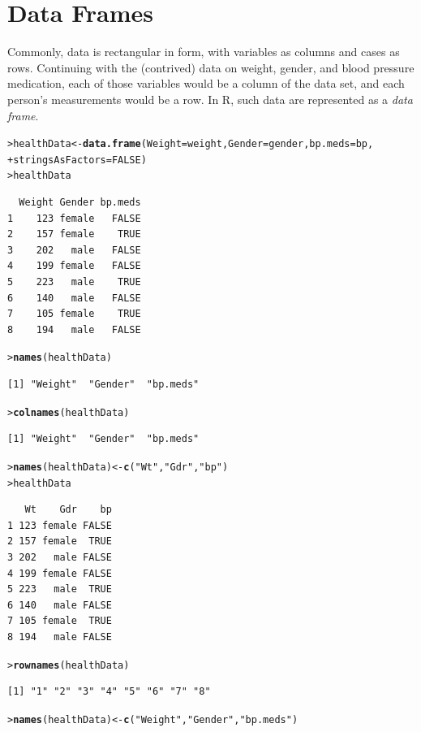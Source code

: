 \documentclass[12pt,oneside]{book}\usepackage[]{graphicx}\usepackage[]{color}
\makeatletter
\newcommand{\hlnum}[1]{\textcolor[rgb]{0.686,0.059,0.569}{#1}}%
\newcommand{\hlstr}[1]{\textcolor[rgb]{0.192,0.494,0.8}{#1}}%
\newcommand{\hlstd}[1]{\textcolor[rgb]{0.345,0.345,0.345}{#1}}%
\newcommand{\hlkwb}[1]{\textcolor[rgb]{0.69,0.353,0.396}{#1}}%
\newcommand{\hlkwc}[1]{\textcolor[rgb]{0.333,0.667,0.333}{#1}}%
\newcommand{\hlkwd}[1]{\textcolor[rgb]{0.737,0.353,0.396}{\textbf{#1}}}%
\newenvironment{kframe}{%
 \def\at@end@of@kframe{}%
 \ifinner\ifhmode%
  \def\at@end@of@kframe{\end{minipage}}%
  \begin{minipage}{\columnwidth}%
 \fi\fi%
 \def\FrameCommand##1{\hskip\@totalleftmargin \hskip-\fboxsep
 \colorbox{shadecolor}{##1}\hskip-\fboxsep
     \hskip-\linewidth \hskip-\@totalleftmargin \hskip\columnwidth}%
 \MakeFramed {\advance\hsize-\width
   \@totalleftmargin\z@ \linewidth\hsize
   \@setminipage}}%
 {\par\unskip\endMakeFramed%
 \at@end@of@kframe}
\newenvironment{knitrout}{}{} %
\makeatother
\begin{document}
\section{Data Frames}\label{SEC:DATAFRAMES}
Commonly, data is rectangular in form, with variables as columns and cases as rows. Continuing with the (contrived) data on weight, gender, and blood pressure medication, each of those variables would be a column of the data set, and each person's measurements would be a row. In R, such data are represented as a \emph{data frame}. 
\begin{knitrout}
\color{fgcolor}\begin{kframe}
\begin{alltt}
\hlstd{> }\hlstd{healthData} \hlkwb{<-} \hlkwd{data.frame}\hlstd{(}\hlkwc{Weight} \hlstd{= weight,} \hlkwc{Gender}\hlstd{=gender,} \hlkwc{bp.meds} \hlstd{= bp,}
\hlstd{+ }                         \hlkwc{stringsAsFactors}\hlstd{=}\hlnum{FALSE}\hlstd{)}
\hlstd{> }\hlstd{healthData}
\end{alltt}
\begin{verbatim}
  Weight Gender bp.meds
1    123 female   FALSE
2    157 female    TRUE
3    202   male   FALSE
4    199 female   FALSE
5    223   male    TRUE
6    140   male   FALSE
7    105 female    TRUE
8    194   male   FALSE
\end{verbatim}
\begin{alltt}
\hlstd{> }\hlkwd{names}\hlstd{(healthData)}
\end{alltt}
\begin{verbatim}
[1] "Weight"  "Gender"  "bp.meds"
\end{verbatim}
\begin{alltt}
\hlstd{> }\hlkwd{colnames}\hlstd{(healthData)}
\end{alltt}
\begin{verbatim}
[1] "Weight"  "Gender"  "bp.meds"
\end{verbatim}
\begin{alltt}
\hlstd{> }\hlkwd{names}\hlstd{(healthData)} \hlkwb{<-} \hlkwd{c}\hlstd{(}\hlstr{"Wt"}\hlstd{,} \hlstr{"Gdr"}\hlstd{,} \hlstr{"bp"}\hlstd{)}
\hlstd{> }\hlstd{healthData}
\end{alltt}
\begin{verbatim}
   Wt    Gdr    bp
1 123 female FALSE
2 157 female  TRUE
3 202   male FALSE
4 199 female FALSE
5 223   male  TRUE
6 140   male FALSE
7 105 female  TRUE
8 194   male FALSE
\end{verbatim}
\begin{alltt}
\hlstd{> }\hlkwd{rownames}\hlstd{(healthData)}
\end{alltt}
\begin{verbatim}
[1] "1" "2" "3" "4" "5" "6" "7" "8"
\end{verbatim}
\begin{alltt}
\hlstd{> }\hlkwd{names}\hlstd{(healthData)} \hlkwb{<-} \hlkwd{c}\hlstd{(}\hlstr{"Weight"}\hlstd{,} \hlstr{"Gender"}\hlstd{,} \hlstr{"bp.meds"}\hlstd{)}
\end{alltt}
\end{kframe}
\end{knitrout}
\end{document}
